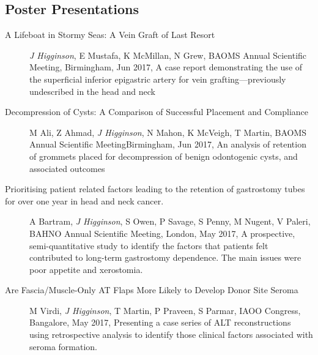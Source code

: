 \subsection*{Poster Presentations}
\begin{description}
        \item[A Lifeboat in Stormy Seas: A Vein Graft of Last Resort]{\emph{J Higginson}, E Mustafa, K McMillan, N Grew, BAOMS Annual Scientific Meeting, Birmingham, Jun 2017, A case report demonstrating the use of the superficial inferior epigastric artery for vein grafting---previously undescribed in the head and neck}
        \item[Decompression of Cysts: A Comparison of Successful Placement and Compliance]{M Ali, Z Ahmad, \emph{J Higginson}, N Mahon, K McVeigh, T Martin, BAOMS Annual Scientific Meeting}{Birmingham, Jun 2017, An analysis of retention of grommets placed for decompression of benign odontogenic cysts, and associated outcomes}
        \item[Prioritising patient related factors leading to the retention of gastrostomy tubes for over one year in head and neck cancer.]{A Bartram, \emph{J Higginson}, S Owen, P Savage, S Penny, M Nugent, V Paleri, BAHNO Annual Scientific Meeting, London, May 2017, A prospective, semi-quantitative study to identify the factors that patients felt contributed to long-term gastrostomy dependence. The main issues were poor appetite and xerostomia.}
        \item[Are Fascia/Muscle-Only AT Flaps More Likely to Develop Donor Site Seroma]{M Virdi, \emph{J Higginson}, T Martin, P Praveen, S Parmar, IAOO Congress, Bangalore, May 2017, Presenting a case series of ALT reconstructions using retrospective analysis to identify those clinical factors associated with seroma formation.}
\end{description}
